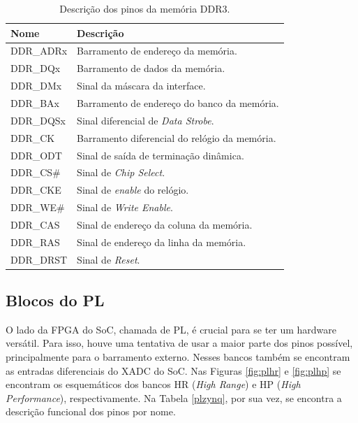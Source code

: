 \begin{table}[H]
	\ABNTEXfontereduzida
	\caption{\label{tab:psddr}Descrição dos pinos da memória DDR3.}
    \centering
    \begin{tabular}{@{} >{\centering}p{4cm} >{\centering}p{8cm} @{}}
    
		\toprule
		\textbf{Nome} & \textbf{Descrição} \tabularnewline 
        \midrule
         DDR\_ADRx & Barramento de endereço da memória. \tabularnewline
        \midrule
         DDR\_DQx & Barramento de dados da memória. \tabularnewline
        \midrule
         DDR\_DMx & Sinal da máscara da interface. \tabularnewline
        \midrule
        DDR\_BAx  & Barramento de endereço do banco da memória. \tabularnewline
        \midrule
        DDR\_DQSx  & Sinal diferencial de \textit{Data Strobe}. \tabularnewline
        \midrule
        DDR\_CK & Barramento diferencial do relógio da memória. \tabularnewline
        \midrule
        DDR\_ODT & Sinal de saída de terminação dinâmica. \tabularnewline
        \midrule
        DDR\_CS\# & Sinal de \textit{Chip Select}. \tabularnewline
        \midrule
        DDR\_CKE & Sinal de \textit{enable} do relógio. \tabularnewline
        \midrule
        DDR\_WE\# & Sinal de \textit{Write Enable}. \tabularnewline
        \midrule
        DDR\_CAS & Sinal de endereço da coluna da memória. \tabularnewline
         \midrule
        DDR\_RAS & Sinal de endereço da linha da memória. \tabularnewline
        \midrule
        DDR\_DRST & Sinal de \textit{Reset}. \tabularnewline
        \bottomrule
	\end{tabular}
\end{table}

\subsection{Blocos do PL}

O lado da FPGA do SoC, chamada de PL, é crucial para se ter um hardware versátil. Para isso, houve uma tentativa de usar a maior parte dos pinos possível, principalmente para o barramento externo. Nesses bancos também se encontram as entradas diferenciais do XADC do SoC. Nas Figuras \ref{fig:plhr} e \ref{fig:plhp} se encontram os esquemáticos dos bancos HR (\textit{High Range}) e HP (\textit{High Performance}), respectivamente. Na Tabela \ref{plzynq}, por sua vez, se encontra a descrição funcional dos pinos por nome.

